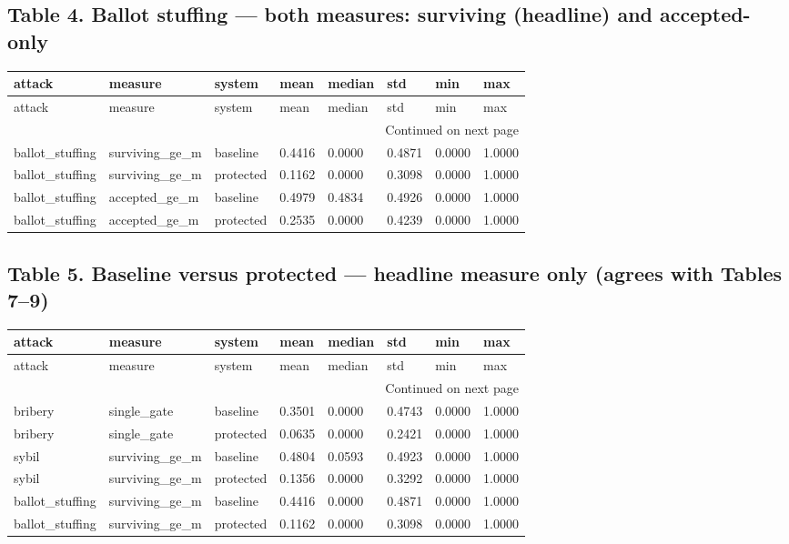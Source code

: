 \documentclass[11pt,a4paper]{article}
\begin{document}
\subsection*{Table 4. Ballot stuffing --- both measures: surviving (headline) and accepted-only}
{\scriptsize
\setlength{\tabcolsep}{3pt}
\begin{longtable}{llllllll}
\toprule
attack & measure & system & mean & median & std & min & max \\
\midrule
\endfirsthead
\toprule
attack & measure & system & mean & median & std & min & max \\
\midrule
\endhead
\midrule
\multicolumn{8}{r}{Continued on next page} \\
\midrule
\endfoot
\bottomrule
\endlastfoot
ballot\_stuffing & surviving\_ge\_m & baseline & 0.4416 & 0.0000 & 0.4871 & 0.0000 & 1.0000 \\
ballot\_stuffing & surviving\_ge\_m & protected & 0.1162 & 0.0000 & 0.3098 & 0.0000 & 1.0000 \\
ballot\_stuffing & accepted\_ge\_m & baseline & 0.4979 & 0.4834 & 0.4926 & 0.0000 & 1.0000 \\
ballot\_stuffing & accepted\_ge\_m & protected & 0.2535 & 0.0000 & 0.4239 & 0.0000 & 1.0000 \\
\end{longtable}

}
\vspace{8pt}
\subsection*{Table 5. Baseline versus protected --- headline measure only (agrees with Tables 7--9)}
{\scriptsize
\setlength{\tabcolsep}{3pt}
\begin{longtable}{llllllll}
\toprule
attack & measure & system & mean & median & std & min & max \\
\midrule
\endfirsthead
\toprule
attack & measure & system & mean & median & std & min & max \\
\midrule
\endhead
\midrule
\multicolumn{8}{r}{Continued on next page} \\
\midrule
\endfoot
\bottomrule
\endlastfoot
bribery & single\_gate & baseline & 0.3501 & 0.0000 & 0.4743 & 0.0000 & 1.0000 \\
bribery & single\_gate & protected & 0.0635 & 0.0000 & 0.2421 & 0.0000 & 1.0000 \\
sybil & surviving\_ge\_m & baseline & 0.4804 & 0.0593 & 0.4923 & 0.0000 & 1.0000 \\
sybil & surviving\_ge\_m & protected & 0.1356 & 0.0000 & 0.3292 & 0.0000 & 1.0000 \\
ballot\_stuffing & surviving\_ge\_m & baseline & 0.4416 & 0.0000 & 0.4871 & 0.0000 & 1.0000 \\
ballot\_stuffing & surviving\_ge\_m & protected & 0.1162 & 0.0000 & 0.3098 & 0.0000 & 1.0000 \\
\end{longtable}

}
\vspace{8pt}
\end{document}
